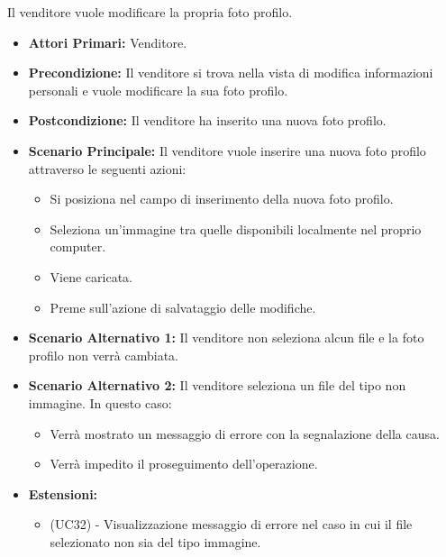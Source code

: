 Il venditore vuole modificare la propria foto profilo.
\begin{itemize}
    \item \textbf{Attori Primari:} Venditore.
    \item \textbf{Precondizione:} Il venditore si trova nella vista di modifica informazioni personali e vuole modificare la sua foto profilo.
    \item \textbf{Postcondizione:} Il venditore ha inserito una nuova foto profilo.
    \item \textbf{Scenario Principale:} Il venditore vuole inserire una nuova foto profilo attraverso le seguenti azioni:
    \begin{itemize}
        \item Si posiziona nel campo di inserimento della nuova foto profilo.
        \item Seleziona un'immagine tra quelle disponibili localmente nel proprio computer.
        \item Viene caricata.
        \item Preme sull'azione di salvataggio delle modifiche.
    \end{itemize}
    \item \textbf{Scenario Alternativo 1:} Il venditore non seleziona alcun file e la foto profilo non verrà cambiata.
    \item \textbf{Scenario Alternativo 2:} Il venditore seleziona un file del tipo non immagine. In questo caso:
    \begin{itemize}
        \item Verrà mostrato un messaggio di errore con la segnalazione della causa.
        \item Verrà impedito il proseguimento dell'operazione.
    \end{itemize}
    \item \textbf{Estensioni:}
    \begin{itemize}
        \item (UC32) - Visualizzazione messaggio di errore nel caso in cui il file selezionato non sia del tipo immagine.
    \end{itemize}
\end{itemize}

